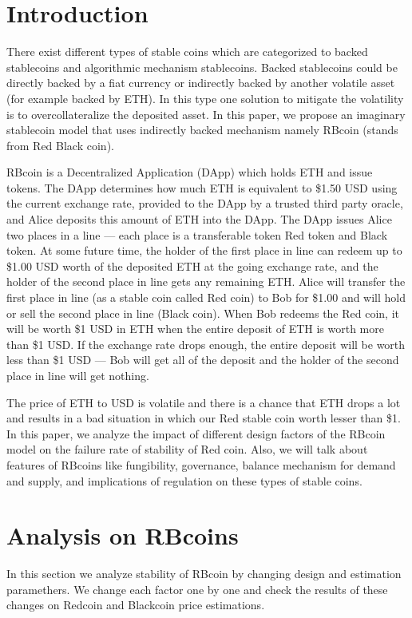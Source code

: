 \section{Introduction}
There exist different types of stable coins which are categorized to backed stablecoins and algorithmic mechanism stablecoins. Backed stablecoins could be directly backed by a fiat currency or indirectly backed by another volatile asset (for example backed by ETH). In this type one solution to mitigate the volatility is to overcollateralize the deposited asset. In this paper, we propose an imaginary stablecoin model that uses indirectly backed mechanism namely RBcoin (stands from Red Black coin).

RBcoin is a Decentralized Application (DApp) which holds ETH and issue tokens. The DApp determines how much ETH is equivalent to \$1.50 USD using the current exchange rate, provided to the DApp by a trusted third party oracle, and Alice deposits this amount of ETH into the DApp. The DApp issues Alice two places in a line — each place is a transferable token Red token and Black token. At some future time, the holder of the first place in line can redeem up to \$1.00 USD worth of the deposited ETH at the going exchange rate, and the holder of the second place in line gets any remaining ETH. Alice will transfer the first place in line (as a stable coin called Red coin) to Bob for \$1.00 and will hold or sell the second place in line (Black coin). When Bob redeems the Red coin, it will be worth \$1 USD in ETH when the entire deposit of ETH is worth more than \$1 USD. If the exchange rate drops enough, the entire deposit will be worth less than \$1 USD — Bob will get all of the deposit and the holder of the second place in line will get nothing.

The price of ETH to USD is volatile and there is a chance that ETH drops a lot and results in a bad situation in which our Red stable coin worth lesser than \$1. In this paper, we analyze the impact of different design factors of the RBcoin model on the failure rate of stability of Red coin. Also, we will talk about features of RBcoins like fungibility, governance, balance mechanism for demand and supply, and implications of regulation on these types of stable coins. 
\section{Analysis on RBcoins}

In this section we analyze stability of RBcoin by changing design and estimation paramethers. We change each factor one by one and check the results of these changes on Redcoin and Blackcoin price estimations.


